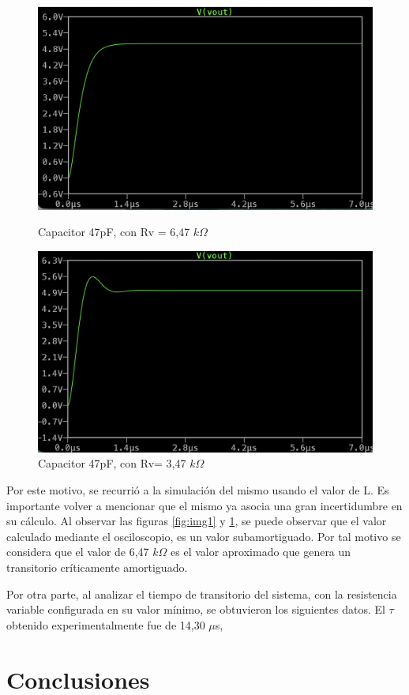 \documentclass{article}
\begin{document}
        \begin{figure}[h]
    \centering
    \begin{minipage}{0.49\textwidth}
        \centering
        \includegraphics[width=\linewidth]{CRITICAMENTE.png}
        \caption{Capacitor 47pF, con Rv = 6,47 $k\Omega$}
        \label{fig:img1}
    \end{minipage}\hfill
    \begin{minipage}{0.49\textwidth}
        \centering
        \includegraphics[width=\linewidth]{SUBAMORT.png}
        \caption{Capacitor 47pF, con Rv= 3,47 $k\Omega$}
        \label{fig:img2}
    \end{minipage}
\end{figure}

        Por este motivo, se recurrió a la simulación del mismo usando el valor de L. Es importante volver a mencionar que el mismo ya asocia una gran incertidumbre en su cálculo. Al observar las figuras \ref{fig:img1} y \ref{fig:img2}, se puede observar que el valor calculado mediante el osciloscopio, es un valor subamortiguado. Por tal motivo se considera que el valor de 6,47 $k\Omega$ es el valor aproximado que genera un transitorio críticamente amortiguado.\par
        Por otra parte, al analizar el tiempo de transitorio del sistema, con la resistencia variable configurada en su valor mínimo, se obtuvieron los siguientes datos. El $\tau$ obtenido experimentalmente fue de 14,30 $\mu$s, 
        
        


\section{Conclusiones}
\end{document}
